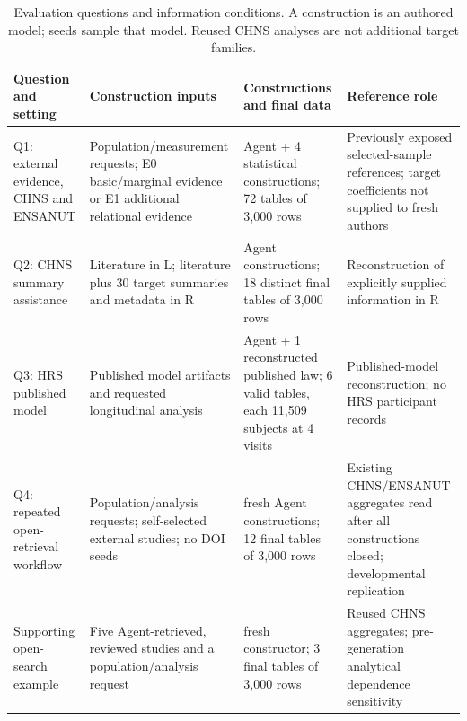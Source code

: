 \documentclass[10pt,twocolumn]{article}
\begin{document}
\begin{table}[t]

\caption{Evaluation questions and information conditions. A construction is an authored model; seeds sample that model. Reused CHNS analyses are not additional target families.}

\label{tab:1}

\centering\fontsize{8}{9.5}\selectfont

\setlength{\tabcolsep}{4pt}

\renewcommand{\arraystretch}{1.12}

\begin{tabularx}{\textwidth}{@{}>{\raggedright\arraybackslash}X>{\raggedright\arraybackslash}X>{\raggedright\arraybackslash}X>{\raggedright\arraybackslash}X@{}}

\toprule

Question and setting & Construction inputs & Constructions and final data & Reference role \\

\midrule

Q1: external evidence, CHNS and ENSANUT & Population/measurement requests; E0 basic/marginal evidence or E1 additional relational evidence & 20 Agent + 4 statistical constructions; 72 tables of 3,000 rows & Previously exposed selected-sample references; target coefficients not supplied to fresh authors \\

Q2: CHNS summary assistance & Literature in L; literature plus 30 target summaries and metadata in R & 6 Agent constructions; 18 distinct final tables of 3,000 rows & Reconstruction of explicitly supplied information in R \\

Q3: HRS published model & Published model artifacts and requested longitudinal analysis & 1 Agent + 1 reconstructed published law; 6 valid tables, each 11,509 subjects at 4 visits & Published-model reconstruction; no HRS participant records \\

Q4: repeated open-retrieval workflow & Population/analysis requests; self-selected external studies; no DOI seeds & 4 fresh Agent constructions; 12 final tables of 3,000 rows & Existing CHNS/ENSANUT aggregates read after all constructions closed; developmental replication \\

Supporting open-search example & Five Agent-retrieved, reviewed studies and a population/analysis request & 1 fresh constructor; 3 final tables of 3,000 rows & Reused CHNS aggregates; pre-generation analytical dependence sensitivity \\

\bottomrule

\end{tabularx}

\end{table}
\end{document}
